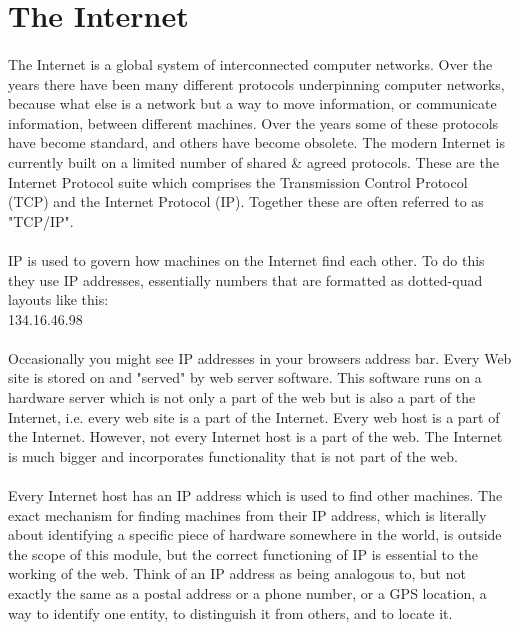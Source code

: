 \section{The Internet}

\paragraph{} The Internet is a global system of interconnected computer networks. Over the years there have been many different protocols underpinning computer networks, because what else is a network but a way to move information, or communicate information, between different machines. Over the years some of these protocols have become standard, and others have become obsolete. The modern Internet is currently built on a limited number of shared \& agreed protocols. These are the Internet Protocol suite which comprises the Transmission Control Protocol (TCP) and the Internet Protocol (IP). Together these are often referred to as "TCP/IP". 

\paragraph{} IP is used to govern how machines on the Internet find each other. To do this they use IP addresses, essentially numbers that are formatted as dotted-quad layouts like this:\\
	134.16.46.98
\paragraph{} Occasionally you might see IP addresses in your browsers address bar. Every Web site is stored on and "served" by web server software. This software runs on a hardware server which is not only a part of the web but is also a part of the Internet, i.e. every web site is a part of the Internet. Every web host is a part of the Internet. However, not every Internet host is a part of the web. The Internet is much bigger and incorporates functionality that is not part of the web. 
\paragraph{} Every Internet host has an IP address which is used to find other machines. The exact mechanism for finding machines from their IP address, which is literally about identifying a specific piece of hardware somewhere in the world, is outside the scope of this module, but the correct functioning of IP is essential to the working of the web. Think of an IP address as being analogous to, but not exactly the same as a postal address or a phone number, or a GPS location, a way to identify one entity, to distinguish it from others, and to locate it.
